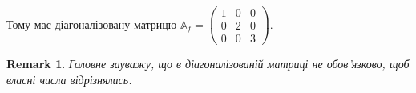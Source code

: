 \documentclass[a4paper, 10pt]{article}
\theoremstyle{theoremdd}
\newtheorem{remark}[theorem]{Remark}
\begin{document}
Тому має діагоналізовану матрицю $\mathbb{A}_f = \begin{pmatrix}
1 & 0 & 0 \\
0 & 2 & 0 \\
0 & 0 & 3
\end{pmatrix}$.
\iffalse
Ба більше, ми можемо розкрити деякі цікаві факти\\
\begin{tikzcd}
\mathbb{R}^3_f \arrow{r}{\mathbb{A}_f} \arrow{d}[swap]{U} & \mathbb{R}^3_f \arrow{d}{U} \\
\mathbb{R}^3_e \arrow{r}{A} & \mathbb{R}^3_e
\end{tikzcd}\\
Тут $U = \begin{pmatrix}
1 & 1 & 1 \\
1 & 0 & 1 \\
1 & 1 & 0 \\
\end{pmatrix}$\\
З картинки можна знайти:\\
$A = U \mathbb{A}_f U^{-1}$\\
$A^2 = A\cdot A = U \mathbb{A}_f U^{-1} U \mathbb{A}_f U^{-1} = U \mathbb{A}_f^2 U^{-1}$\\
$A^3 = A^2 \cdot A = U \mathbb{A}^2_f U^{-1} U \mathbb{A}_f U^{-1} = U \mathbb{A}_f^3 U^{-1}$\\
Ну і т.д.
\fi
\begin{remark}
Головне зауважу, що в діагоналізованій матриці не обов'язково, щоб власні числа відрізнялись.
\end{remark}
\end{document}

